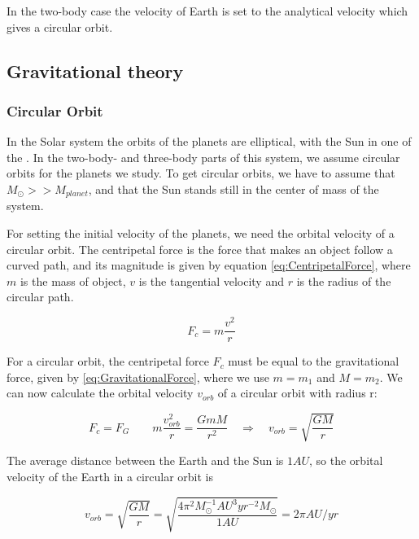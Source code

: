 \documentclass[norsk,a4paper,12pt]{article}
\begin{document}
In the two-body case the velocity of Earth is set to the analytical velocity which gives a circular orbit. 
 
\subsection{Gravitational theory}
\subsubsection{Circular Orbit}
In the Solar system the orbits of the planets are elliptical, with the Sun in one of the \cite{kepler}. In the two-body- and three-body parts of this system, we assume circular orbits for the planets we study. To get circular orbits, we have to assume that $M_{\odot} >> M_{planet}$, and that the Sun stands still in the center of mass of the system. \par
\vspace{3mm}

For setting the initial velocity of the planets, we need the orbital velocity of a circular orbit. The centripetal force is the force that makes an object follow a curved path, and its magnitude is given by equation \ref{eq:CentripetalForce}, where $m$ is the mass of object, $v$ is the tangential velocity and $r$ is the radius of the circular path. 

\begin{equation}
     F_c = m \frac{v^2}{r}
     \label{eq:CentripetalForce}
\end{equation}

For a circular orbit, the centripetal force $F_c$ must be equal to the gravitational force, given by \ref{eq:GravitationalForce}, where we use $m = m_1$ and $M =m_2$. We can now calculate the orbital velocity $v_{orb}$ of a circular orbit with radius r:

\begin{equation}
    F_c = F_G \quad \quad m \frac{v_{orb}^2}{r} = \frac{GmM}{r^2} \quad \Rightarrow \quad v_{orb} = \sqrt{\frac{GM}{r}}
    \label{eq:OrbitalVelocity}
\end{equation}

The average distance between the Earth and the Sun is $1 AU$, so the orbital velocity of the Earth in a circular orbit is

\begin{equation}
v_{orb} = \sqrt{\frac{GM}{r}} = \sqrt{\frac{ 4\pi^2 M_{\odot} ^{-1} AU^3 yr^{-2} M_{\odot}}{1 AU}} = 2\pi AU/yr 
\label{eq:AnalyticVel}
\end{equation}
\end{document}
